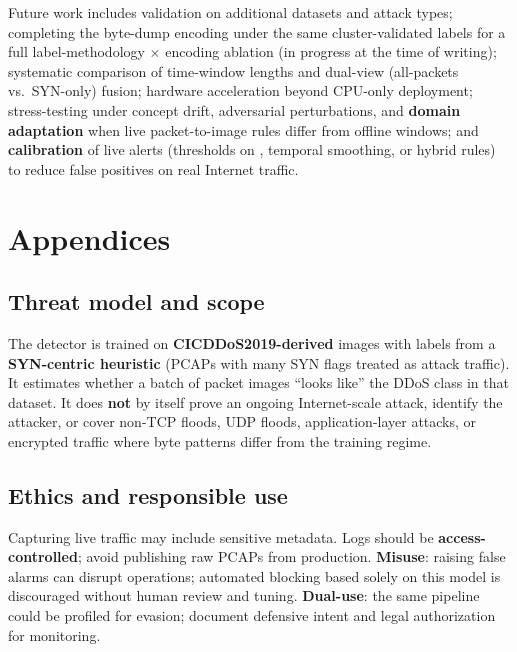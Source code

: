 Future work includes validation on additional datasets and attack types;
completing the byte-dump encoding under the same cluster-validated labels for
a full label-methodology $\times$ encoding ablation (in progress at the time
of writing); systematic comparison of time-window lengths and dual-view
(all-packets vs.\ SYN-only) fusion; hardware acceleration beyond CPU-only
deployment; stress-testing under concept drift, adversarial perturbations,
and \textbf{domain adaptation} when live packet-to-image rules differ from
offline windows; and \textbf{calibration} of live alerts (thresholds on
, temporal smoothing, or hybrid rules) to reduce false positives
on real Internet traffic.


\chapter{Appendices}

\section{Threat model and scope}
The detector is trained on \textbf{CICDDoS2019-derived} images with labels from a
\textbf{SYN-centric heuristic} (PCAPs with many SYN flags treated as attack
traffic). It estimates whether a batch of packet images ``looks like'' the DDoS
class in that dataset. It does \textbf{not} by itself prove an ongoing
Internet-scale attack, identify the attacker, or cover non-TCP floods, UDP
floods, application-layer attacks, or encrypted traffic where byte patterns
differ from the training regime.

\section{Ethics and responsible use}
Capturing live traffic may include sensitive metadata. Logs should be
\textbf{access-controlled}; avoid publishing raw PCAPs from production.
\textbf{Misuse}: raising false alarms can disrupt operations; automated blocking
based solely on this model is discouraged without human review and tuning.
\textbf{Dual-use}: the same pipeline could be profiled for evasion; document
defensive intent and legal authorization for monitoring.

